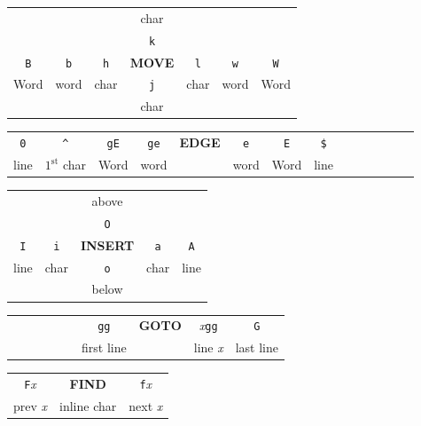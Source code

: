 \documentclass[12pt]{article}
\begin{document}
\begin{center}
  \begin{tabular}{ccccccc}
    & & & char & & & \\
    & & & \texttt{k}& & & \\
   \texttt{B} & \texttt{b}& \texttt{h}& \large{\textbf{MOVE}} & \texttt{l}& \texttt{w}& \texttt{W}\\
   Word & word & char & \texttt{j} & char & word & Word \\
    & & & char & & & \\
  \end{tabular}
\end{center}

\begin{center}
  \begin{tabular}{ccccccccc}
   \texttt{0} & \texttt{\^}& \texttt{gE}&\texttt{ge}& \large{\textbf{EDGE}} & \texttt{e}& \texttt{E}& \texttt{\$} & \ \ \ \ \ \ \ \ \ \ \\
   line & $1^{\text{st}}$ char & Word & word &  & word & Word & line & \ \ \ \ \\
  \end{tabular}
\end{center}

\begin{center}
  \begin{tabular}{ccccc}
   & & above & & \\
   & & \texttt{O} & & \\
   \texttt{I} & \texttt{i} & \large{\textbf{INSERT}} & \texttt{a} & \texttt{A} \\
   line & char & \texttt{o} & char & line \\
   & & below & &
  \end{tabular}
\end{center}

\begin{center}
  \begin{tabular}{ccccc}
   \ \ \ \ \ \ \ \ \ & \texttt{gg} & \large{\textbf{GOTO}} & \textit{x}\texttt{gg} & \texttt{G} \\
   \ \ \ \ & first line & & line \textit{x} & last line \\
  \end{tabular}
\end{center}

\begin{center}
  \begin{tabular}{ccc}
   \texttt{F}\textit{x} & \large{\textbf{FIND}} & \texttt{f}\textit{x} \\
   prev \textit{x} & inline char & next \textit{x} \\
  \end{tabular}
\end{center}
\end{document}
